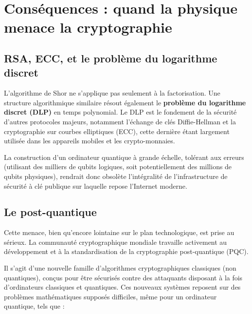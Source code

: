 \documentclass[11pt,a4paper]{article}
\begin{document}
\section{Conséquences : quand la physique menace la cryptographie}

\subsection{RSA, ECC, et le problème du logarithme discret}

L'algorithme de Shor ne s'applique pas seulement à la factorisation. Une structure algorithmique similaire résout également le \textbf{problème du logarithme discret (DLP)} en temps polynomial. Le DLP est le fondement de la sécurité d'autres protocoles majeurs, notamment l'échange de clés Diffie-Hellman et la cryptographie sur courbes elliptiques (ECC), cette dernière étant largement utilisée dans les appareils mobiles et les crypto-monnaies.

La construction d'un ordinateur quantique à grande échelle, tolérant aux erreurs (utilisant des milliers de qubits logiques, soit potentiellement des millions de qubits physiques), rendrait donc obsolète l'intégralité de l'infrastructure de sécurité à clé publique sur laquelle repose l'Internet moderne.

\subsection{Le post-quantique}

Cette menace, bien qu'encore lointaine sur le plan technologique, est prise au sérieux. La communauté cryptographique mondiale travaille activement au développement et à la standardisation de la cryptographie post-quantique (PQC).

Il s'agit d'une nouvelle famille d'algorithmes cryptographiques classiques (non quantiques), conçus pour être sécurisés contre des attaquants disposant à la fois d'ordinateurs classiques et quantiques. Ces nouveaux systèmes reposent sur des problèmes mathématiques supposés difficiles, même pour un ordinateur quantique, tels que :
\end{document}
